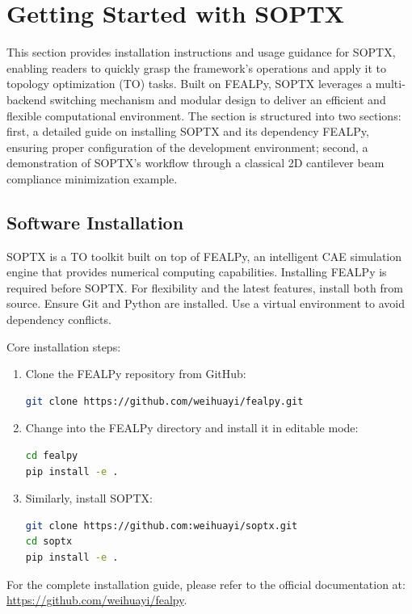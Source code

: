\documentclass[mathpazo]{cicp}
\begin{document}
\section{Getting Started with SOPTX}
This section provides installation instructions and usage guidance for SOPTX, enabling readers to quickly grasp the framework's operations and apply it to topology optimization (TO) tasks. Built on FEALPy, SOPTX leverages a multi-backend switching mechanism and modular design to deliver an efficient and flexible computational environment. The section is structured into two sections: first, a detailed guide on installing SOPTX and its dependency FEALPy, ensuring proper configuration of the development environment; second, a demonstration of SOPTX's workflow through a classical 2D cantilever beam compliance minimization example.

\subsection{Software Installation}
SOPTX is a TO toolkit built on top of FEALPy, an intelligent CAE simulation engine that provides numerical computing capabilities. Installing FEALPy is required before SOPTX. For flexibility and the latest features, install both from source. Ensure Git and Python are installed. Use a virtual environment to avoid dependency conflicts.

Core installation steps:
\begin{enumerate} 
	\item Clone the FEALPy repository from GitHub:
\begin{lstlisting}[language=bash]
git clone https://github.com/weihuayi/fealpy.git
\end{lstlisting}
	\item Change into the FEALPy directory and install it in editable mode:
\begin{lstlisting}[language=bash]
cd fealpy
pip install -e . 
\end{lstlisting}
	\item Similarly, install SOPTX:
\begin{lstlisting}[language=bash]
git clone https://github.com:weihuayi/soptx.git
cd soptx
pip install -e . 
\end{lstlisting}
\end{enumerate}

For the complete installation guide, please refer to the official documentation at: \url{https://github.com/weihuayi/fealpy}.
\end{document}
